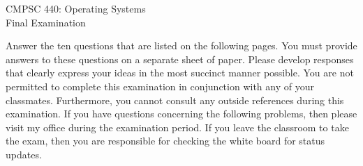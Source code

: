 \documentclass[12pt,epsf,psfig,graphics]{article}
\def\widow#1{\vskip #1\vbadness10000\penalty-200\vskip-#1}
\begin{document}

\def\widow#1{\vskip #1\vbadness10000\penalty-200\vskip-#1}

\begin{center}

CMPSC 440: Operating Systems\\
Final Examination \\

\end{center}

\noindent Answer the ten questions that are listed on the following pages.  You must provide answers to these questions
on a separate sheet of paper.  Please develop responses that clearly express your ideas in the most succinct manner
possible.  You are not permitted to complete this examination in conjunction with any of your classmates.  Furthermore,
you cannot consult any outside references during this examination.  If you have questions concerning the following
problems, then please visit my office during the examination period.  If you leave the classroom to take the exam, then
you are responsible for checking the white board for status updates.

\end{document}
